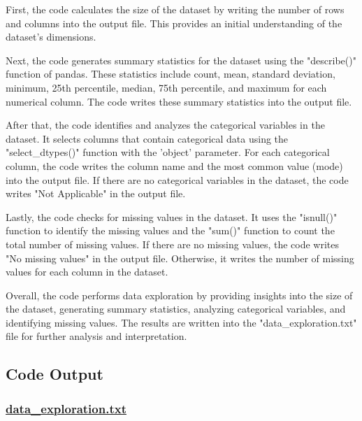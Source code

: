 \documentclass[11pt]{article}
\begin{document}
First, the code calculates the size of the dataset by writing the number of rows and columns into the output file. This provides an initial understanding of the dataset's dimensions.

Next, the code generates summary statistics for the dataset using the "describe()" function of pandas. These statistics include count, mean, standard deviation, minimum, 25th percentile, median, 75th percentile, and maximum for each numerical column. The code writes these summary statistics into the output file.

After that, the code identifies and analyzes the categorical variables in the dataset. It selects columns that contain categorical data using the "select\_dtypes()" function with the 'object' parameter. For each categorical column, the code writes the column name and the most common value (mode) into the output file. If there are no categorical variables in the dataset, the code writes "Not Applicable" in the output file.

Lastly, the code checks for missing values in the dataset. It uses the "isnull()" function to identify the missing values and the "sum()" function to count the total number of missing values. If there are no missing values, the code writes "No missing values" in the output file. Otherwise, it writes the number of missing values for each column in the dataset.

Overall, the code performs data exploration by providing insights into the size of the dataset, generating summary statistics, analyzing categorical variables, and identifying missing values. The results are written into the "data\_exploration.txt" file for further analysis and interpretation.

\subsection{Code Output}\hypertarget{file-data-exploration-txt}{}

\subsubsection*{\hyperlink{code-Data Exploration-data-exploration-txt}{data\_exploration.txt}}
\end{document}
